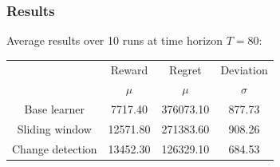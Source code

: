\begin{frame}
\frametitle{Results}

Average results over 10 runs at time horizon $T = 80$:

\begin{table}
    \begin{tabular}{|c|cc|c|}
    \hline \hline
        \cellcolor{blue!25} & Reward 	& Regret	& Deviation \\
    \cline{2-4}
        \cellcolor{blue!25} & $\mu$		& $\mu$		& $\sigma$	\\
    \hline \hline
        Base learner		& 7717.40	& 376073.10	& 877.73	\\
    \hline
        Sliding window		& 12571.80	& 271383.60	& 908.26	\\
    \hline
        Change detection	& 13452.30	& 126329.10	& 684.53	\\
    \hline \hline
    \end{tabular}
\end{table}

\end{frame}

